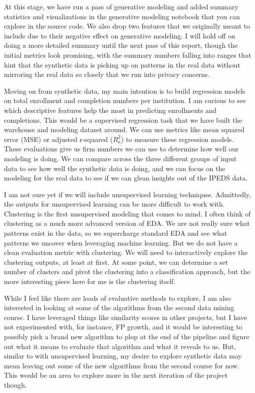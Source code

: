 \documentclass[sigconf, authorversion, nonacm]{acmart}
\begin{document}
    At this stage, we have run a pass of generative modeling and added summary statistics and visualizations in the generative modeling notebook that you can explore in the source code. We also drop two features that we originally meant to include due to their negative effect on generative modeling. I will hold off on doing a more detailed summary until the next pass of this report, though the initial metrics look promising, with the summary numbers falling into ranges that hint that the synthetic data is picking up on patterns in the real data without mirroring the real data so closely that we run into privacy concerns.

    Moving on from synthetic data, my main intention is to build regression models on total enrollment and completion numbers per institution. I am curious to see which descriptive features help the most in predicting enrollments and completions. This would be a supervised regression task that we have built the warehouse and modeling dataset around. We can use metrics like mean squared error (MSE) or adjusted r-squared ($R^2_a$) to measure these regression models. These evaluations give us firm numbers we can use to determine how well our modeling is doing. We can compare across the three different groups of input data to see how well the synthetic data is doing, and we can focus on the modeling for the real data to see if we can glean insights out of the IPEDS data.

    I am not sure yet if we will include unsupervised learning techniques. Admittedly, the outputs for unsupervised learning can be more difficult to work with. Clustering is the first unsupervised modeling that comes to mind. I often think of clustering as a much more advanced version of EDA. We are not really sure what patterns exist in the data, so we supercharge standard EDA and see what patterns we uncover when leveraging machine learning. But we do not have a clean evaluation metric with clustering. We will need to interactively explore the clustering outputs, at least at first. At some point, we can determine a set number of clusters and pivot the clustering into a classification approach, but the more interesting piece here for me is the clustering itself.

    While I feel like there are loads of evaluative methods to explore, I am also interested in looking at some of the algorithms from the second data mining course. I have leveraged things like similarity scores in other projects, but I have not experimented with, for instance, FP growth, and it would be interesting to possibly pick a brand new algorithm to plop at the end of the pipeline and figure out what it means to evaluate that algorithm and what it reveals to us. But, similar to with unsupervised learning, my desire to explore synthetic data may mean leaving out some of the new algorithms from the second course for now. This would be an area to explore more in the next iteration of the project though.
\end{document}
